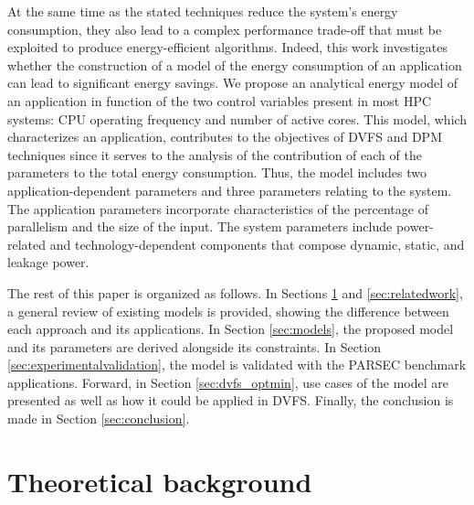 \documentclass{ieeeaccess}
\begin{document}
At the same time as the stated techniques reduce the system's energy consumption, they also lead to a complex performance trade-off that must be exploited to produce energy-efficient algorithms.
Indeed, this work investigates whether the construction of a model of the energy consumption of an application can lead to significant energy savings. We propose an analytical energy model of an application in function of the two control variables present in most HPC systems: CPU operating frequency and number of active cores. 
This model, which characterizes an application, contributes to the objectives of DVFS and DPM techniques since it serves to the analysis of the contribution of each of the parameters to the total energy consumption.
Thus, the model includes two application-dependent parameters and three parameters relating to the system. The application parameters incorporate characteristics of the percentage of parallelism and the size of the input. The system parameters include power-related and technology-dependent components that compose dynamic, static, and leakage power.

The rest of this paper is organized as follows. In Sections \ref{sec:background} and \ref{sec:relatedwork}, a general review of existing models is provided, showing the difference between each approach and its applications. In Section \ref{sec:models}, the proposed model and its parameters are derived alongside its constraints. In Section \ref{sec:experimentalvalidation}, the model is validated with the PARSEC benchmark applications. Forward, in Section \ref{sec:dvfs_optmin}, use cases of the model are presented as well as how it could be applied in DVFS. Finally, the conclusion is made in Section \ref{sec:conclusion}.
 
\section{Theoretical background} \label{sec:background}
\end{document}

